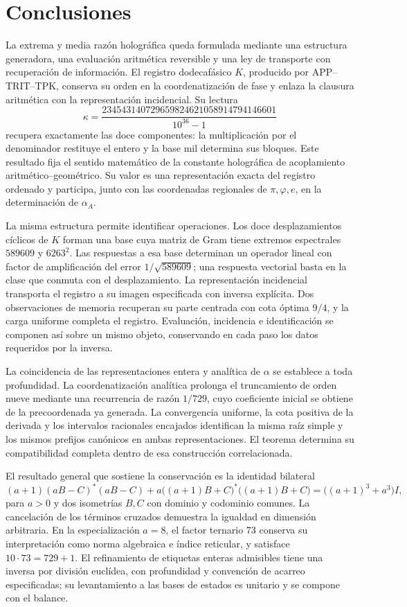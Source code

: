 \section{Conclusiones}
\label{paper:conclusiones}
La extrema y media razón holográfica queda formulada mediante una estructura generadora, una evaluación aritmética reversible y una ley de transporte con recuperación de información. El registro dodecafásico \(K\), producido por APP--TRIT--TPK, conserva su orden en la coordenatización de fase y enlaza la clausura aritmética con la representación incidencial. Su lectura
\[
\kappa=
\frac{234543140729659824621058914794146601}{10^{36}-1}
\]
recupera exactamente las doce componentes: la multiplicación por el denominador restituye el entero y la base mil determina sus bloques. Este resultado fija el sentido matemático de la constante holográfica de acoplamiento aritmético--geométrico. Su valor es una representación exacta del registro ordenado y participa, junto con las coordenadas regionales de \(\pi,\varphi,e\), en la determinación de \(\alpha_A\).

La misma estructura permite identificar operaciones. Los doce desplazamientos cíclicos de \(K\) forman una base cuya matriz de Gram tiene extremos espectrales \(589609\) y \(6263^2\). Las respuestas a esa base determinan un operador lineal con factor de amplificación del error \(1/\sqrt{589609}\); una respuesta vectorial basta en la clase que conmuta con el desplazamiento. La representación incidencial transporta el registro a su imagen especificada con inversa explícita. Dos observaciones de memoria recuperan su parte centrada con cota óptima \(9/4\), y la carga uniforme completa el registro. Evaluación, incidencia e identificación se componen así sobre un mismo objeto, conservando en cada paso los datos requeridos por la inversa.

La coincidencia de las representaciones entera y analítica de \(\alpha\) se establece a toda profundidad. La coordenatización analítica prolonga el truncamiento de orden nueve mediante una recurrencia de razón \(1/729\), cuyo coeficiente inicial se obtiene de la precoordenada ya generada. La convergencia uniforme, la cota positiva de la derivada y los intervalos racionales encajados identifican la misma raíz simple y los mismos prefijos canónicos en ambas representaciones. El teorema determina su compatibilidad completa dentro de esa construcción correlacionada.

El resultado general que sostiene la conservación es la identidad bilateral
\[
 (a+1)(aB-C)^*(aB-C)
 +a\bigl((a+1)B+C\bigr)^*\bigl((a+1)B+C\bigr)
 =\bigl((a+1)^3+a^3\bigr)I,
\]
para \(a>0\) y dos isometrías \(B,C\) con dominio y codominio comunes. La cancelación de los términos cruzados demuestra la igualdad en dimensión arbitraria. En la especialización \(a=8\), el factor ternario \(73\) conserva su interpretación como norma algebraica e índice reticular, y satisface \(10\cdot73=729+1\). El refinamiento de etiquetas enteras admisibles tiene una inversa por división euclídea, con profundidad y convención de acarreo especificadas; su levantamiento a las bases de estados es unitario y se compone con el balance.

